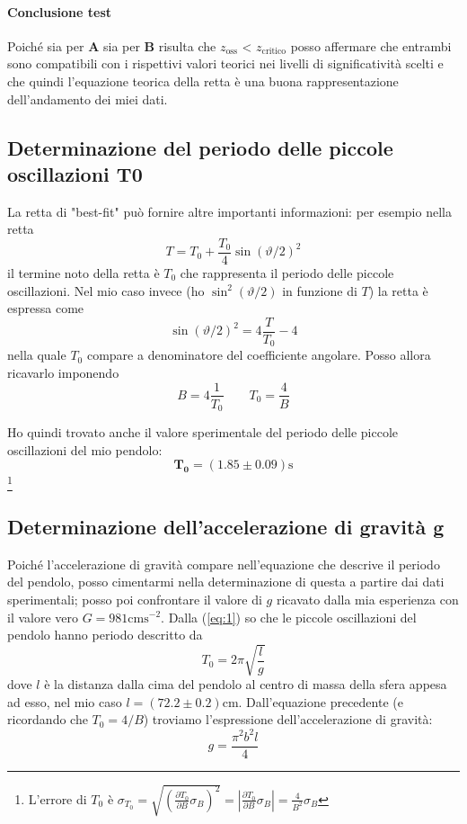 \documentclass{article}
\begin{document}
	\paragraph{Conclusione test} Poiché sia per $\mathbf{A}$ sia per $\mathbf{B}$ risulta che $z_{\text{oss}}$ < $z_{\text{critico}}$ posso affermare che entrambi sono compatibili con i rispettivi valori teorici nei livelli di significatività scelti e che quindi l'equazione teorica della retta è una buona rappresentazione dell'andamento dei miei dati.
	
	\subsection{Determinazione del periodo delle piccole oscillazioni T0}
	La retta di "best-fit" può fornire altre importanti informazioni: per esempio nella retta 
	\[
	T = T_0 + \frac{T_0}{4}\sin{\left(\vartheta/2\right)}^2
	\]
	il termine noto della retta è $T_0$ che rappresenta il periodo delle piccole oscillazioni. Nel mio caso invece (ho $\sin^2(\vartheta/2)$ in funzione di $T$) la retta è espressa come
	\[
	\sin{\left(\vartheta/2\right)}^2 = 4\frac{T}{T_0} - 4
	\]
	nella quale $T_0$ compare a denominatore del coefficiente angolare. Posso allora ricavarlo imponendo
	\[
	B =  4\frac{1}{T_0} \qquad T_0 = \frac{4}{B} 
	\]
	
	\noindent
	Ho quindi trovato anche il valore sperimentale del periodo delle piccole oscillazioni del mio pendolo:
	\[
	\mathbf{T_0} = (1.85 \pm 0.09)\text{s}
	\]
	\footnote{L'errore di $T_0$ è $\sigma_{T_0} = \sqrt{\left(\frac{\partial T_0}{\partial B}\sigma_{B}\right)^2} = \left|\frac{\partial T_0}{\partial B}\sigma_{B}\right| = \frac{4}{B^2}\sigma_B$}
	
	\subsection{Determinazione dell'accelerazione di gravità g}
	Poiché l'accelerazione di gravità compare nell'equazione che descrive il periodo del pendolo, posso cimentarmi nella determinazione di questa a partire dai dati sperimentali; posso poi confrontare il valore di $g$ ricavato dalla mia esperienza con il valore vero $G = 981 \text{cms}^{-2}$. Dalla (\ref{eq:1}) so che le piccole oscillazioni del pendolo hanno periodo descritto da
	\[
	T_0 = 2\pi \sqrt{\frac{l}{g}} 
	\]
	dove $l$ è la distanza dalla cima del pendolo al centro di massa della sfera appesa ad esso, nel mio caso $l = (72.2 \pm 0.2)$cm. Dall'equazione precedente (e ricordando che $T_0 = 4/B$) troviamo l'espressione dell'accelerazione di gravità:
	\[
	g = \frac{\pi^2b^2l}{4}
	\]
	
\end{document}
